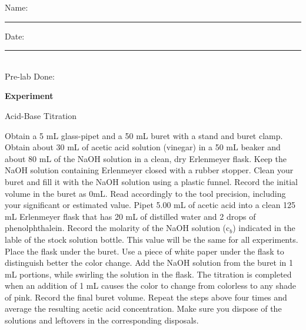 \documentclass[main.tex]{subfiles}
\begin{document}
\clearpage\thispagestyle{empty}\mbox{}\clearpage



\begin{multicols}{2}
\begin{tcolorbox}[enhanced jigsaw,breakable,size=title,
colback=mybrown!05,colframe=black,fonttitle=\bfseries,
title=STUDENT INFO,pad at break=1mm, break at=15cm/0pt ]
\vspace{0.2cm}
\noindent Name: \rule{5cm}{0.4pt}Date:\rule{1cm}{0.4pt}\\
Pre-lab Done: \quad
\end{tcolorbox}
\end{multicols}
\hfill
\vspace{0.2cm}
\begin{center}
{\large \bfseries 
Experiment
\par
\Huge
Acid-Base Titration
\\[5pt] \par}
\vspace{0.2cm}
\end{center}
\par
\noindent
\uline{  \hfill \normalsize \hfill       }

\vspace{0.2cm}{\large \bfseries 1. Acetic acid titration}

\begin{steps}
      \newstep[] Obtain a 5 mL glass-pipet and a 50 mL buret with a stand and buret clamp.
    \newstep[] Obtain about 30 mL of acetic acid solution (vinegar) in a 50 mL beaker and about 80 mL of the NaOH solution in a clean, dry Erlenmeyer flask. Keep the NaOH solution containing Erlenmeyer closed with a rubber stopper. 
    \newstep[] Clean your buret and fill it with the NaOH solution using a plastic funnel. 
    \newstep[] Record the initial volume in the buret as 0mL. Read accordingly to the tool precision, including your significant or estimated value.
  \newstep[] Pipet 5.00 mL of acetic acid into a clean 125 mL Erlenmeyer flask that has 20 mL of distilled water and 2 drops of phenolphthalein. 
       \newstep[] Record the molarity of the NaOH solution (c$_b$) indicated in the lable of the stock solution bottle. This value will be the same for all experiments.
       \newstep[] Place the flask under the buret. Use a piece of white paper under the flask to distinguish better the color change.
       \newstep[] Add the NaOH solution from the buret in 1 mL portions, while swirling the solution in the flask. 
       \newstep[] The titration is completed when an addition of 1 mL causes the color to change from colorless to any shade of pink. Record the final buret volume.
              \newstep[] Repeat the steps above four times and average the resulting acetic acid concentration.
              \newstep[] Make sure you dispose of the solutions and leftovers in the corresponding disposals.

\end{steps}
\end{document}
